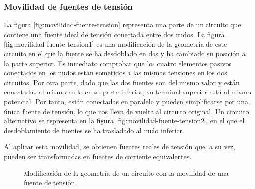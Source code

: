 \subsubsection{Movilidad de fuentes de tensión}
\label{sec:movilidad-fuentes-tension}

La figura \ref{fig:movilidad-fuente-tension} representa una parte de
un circuito que contiene una fuente ideal de tensión conectada entre
dos nudos. La figura \ref{fig:movilidad-fuente-tension1} es una
modificación de la geometría de este circuito en el que la fuente se
ha desdoblado en dos y ha cambiado su posición a la parte superior. Es
inmediato comprobar que los cuatro elementos pasivos conectados en los
nudos están sometidos a las mismas tensiones en los dos circuitos. Por
otra parte, dado que las dos fuentes son del mismo valor y están
conectadas al mismo nudo en su parte inferior, su terminal superior
está al mismo potencial. Por tanto, están conectadas en paralelo y
pueden simplificarse por una única fuente de tensión, lo que nos lleva
de vuelta al circuito original. Un circuito alternativo se representa
en la figura \ref{fig:movilidad-fuente-tension2}, en el que el
desdoblamiento de fuentes se ha trasladado al nudo inferior.

Al aplicar esta movilidad, se obtienen fuentes reales de tensión que,
a su vez, pueden ser transformadas en fuentes de corriente
equivalentes.
\begin{figure}[H]
  \centering {}\hfill
  \hfill
  \caption{Modificación de la geometría de un circuito con la
    movilidad de una fuente de tensión.}
\end{figure}
